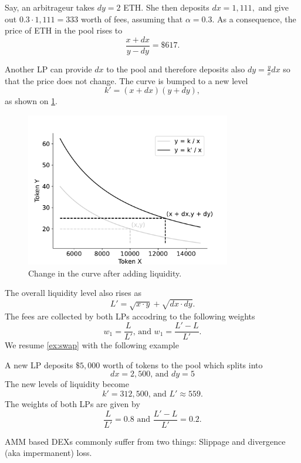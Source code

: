 \begin{ex}\label{ex:swap}
Say, an arbitrageur takes $dy=2$ ETH. She then deposits $dx = 1,111, $ and give out $0.3\cdot 1,111 = 333$ worth of fees, assuming that $\alpha = 0.3$. As a consequence, the price of ETH in the pool rises to 
      $$
      \frac{x+dx}{y-dy} = \$ 617.
      $$
\end{ex}
Another LP can provide $dx$ to the pool and therefore deposits also $dy = \frac{y}{x}dx$ so that the price does not change. The curve is bumped to a new level 
$$
k' = (x+dx)(y+dy),
$$
as shown on \cref{fig:new_k_curve}.
\begin{figure}[!ht]
\begin{center}
 \includegraphics[width = 0.8\textwidth]{../Figures/AMM_after_drop.pdf}
\caption{Change in the curve after adding liquidity.}
\label{fig:new_k_curve}
\end{center}
\end{figure}
The overall liquidity level also rises as 
$$
L' = \sqrt{x\cdot y} + \sqrt{dx\cdot dy}.
$$
The fees are collected by both LPs accodring to the following weights 
$$
w_1=\frac{L}{L'}\text{, and }w_1=\frac{L'- L}{L'}.
$$
We resume \cref{ex:swap} with the following example
\begin{ex}\label{ex:add_liquidity}
A new LP deposits $\$5,000$ worth of tokens to the pool which splits into 
$$
dx = 2,500\text{, and }dy = 5
$$
The new levels of liquidity become 
$$
k' = 312,500\text{, and }L'\approx 559.
$$
The weights of both LPs are given by
$$
\frac{L}{L'} = 0.8\text{ and }\frac{L'-L}{L'} = 0.2.
$$
\end{ex}
AMM based DEXs commonly suffer from two things: Slippage and divergence (aka impermanent) loss. \\

